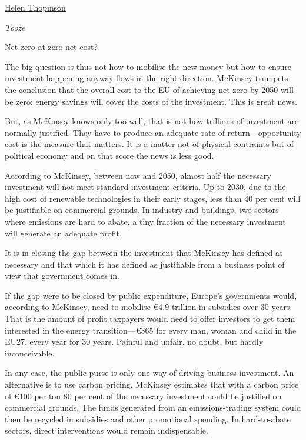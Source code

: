\documentclass[
]{book}
\begin{document}
\href{https://engelsbergideas.com/essays/the-geopolitical-fight-to-come-over-green-energy/}{Helen Thopmson}

\emph{Tooze}

Net-zero at zero net cost?

The big question is thus not how to mobilise the new money but how to ensure investment happening anyway flows in the right direction. McKinsey trumpets the conclusion that the overall cost to the EU of achieving net-zero by 2050 will be zero: energy savings will cover the costs of the investment. This is great news.

But, as McKinsey knows only too well, that is not how trillions of investment are normally justified. They have to produce an adequate rate of return---opportunity cost is the measure that matters. It is a matter not of physical contraints but of political economy and on that score the news is less good.

According to McKinsey, between now and 2050, almost half the necessary investment will not meet standard investment criteria. Up to 2030, due to the high cost of renewable technologies in their early stages, less than 40 per cent will be justifiable on commercial grounds. In industry and buildings, two sectors where emissions are hard to abate, a tiny fraction of the necessary investment will generate an adequate profit.

It is in closing the gap between the investment that McKinsey has defined as necessary and that which it has defined as justifiable from a business point of view that government comes in.

If the gap were to be closed by public expenditure, Europe's governments would, according to McKinsey, need to mobilise €4.9 trillion in subsidies over 30 years. That is the amount of profit taxpayers would need to offer investors to get them interested in the energy transition---€365 for every man, woman and child in the EU27, every year for 30 years. Painful and unfair, no doubt, but hardly inconceivable.

In any case, the public purse is only one way of driving business investment. An alternative is to use carbon pricing. McKinsey estimates that with a carbon price of €100 per ton 80 per cent of the necessary investment could be justified on commercial grounds. The funds generated from an emissions-trading system could then be recycled in subsidies and other promotional spending. In hard-to-abate sectors, direct interventions would remain indispensable.
\end{document}
